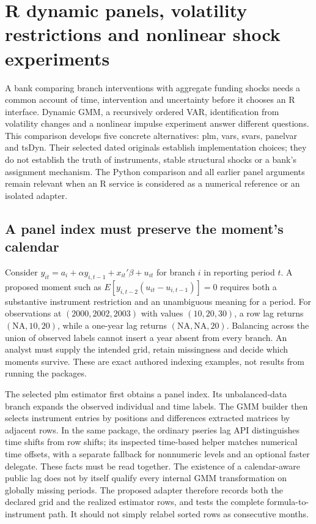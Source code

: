 \section[R dynamic panels and structural shocks]{R dynamic panels, volatility restrictions and nonlinear shock experiments}
\label{sec:exec25-r-dynamic}

A bank comparing branch interventions with aggregate funding shocks needs a common account of time, intervention and uncertainty before it chooses an R interface. Dynamic GMM, a recursively ordered VAR, identification from volatility changes and a nonlinear impulse experiment answer different questions. This comparison develops five concrete alternatives: plm, vars, svars, panelvar and tsDyn. Their selected dated originals establish implementation choices; they do not establish the truth of instruments, stable structural shocks or a bank's assignment mechanism. The Python comparison and all earlier panel arguments remain relevant when an R service is considered as a numerical reference or an isolated adapter.\citep{exec25_rdyn_plm,exec25_rdyn_vars,exec25_rdyn_svars,exec25_rdyn_panelvar,exec25_rdyn_tsdyn,exec25_rdyn_choice}

\subsection{A panel index must preserve the moment's calendar}

Consider $y_{it}=a_i+\alpha y_{i,t-1}+x_{it}'\beta+u_{it}$ for branch $i$ in reporting period $t$. A proposed moment such as $E[y_{i,t-2}(u_{it}-u_{i,t-1})]=0$ requires both a substantive instrument restriction and an unambiguous meaning for a period. For observations at $(2000,2002,2003)$ with values $(10,20,30)$, a row lag returns $(\mathrm{NA},10,20)$, while a one-year lag returns $(\mathrm{NA},\mathrm{NA},20)$. Balancing across the union of observed labels cannot insert a year absent from every branch. An analyst must supply the intended grid, retain missingness and decide which moments survive. These are exact authored indexing examples, not results from running the packages.\citep{exec25_rdyn_choice}

The selected plm estimator first obtains a panel index. Its unbalanced-data branch expands the observed individual and time labels. The GMM builder then selects instrument entries by positions and differences extracted matrices by adjacent rows. In the same package, the ordinary pseries lag API distinguishes time shifts from row shifts; its inspected time-based helper matches numerical time offsets, with a separate fallback for nonnumeric levels and an optional faster delegate. These facts must be read together. The existence of a calendar-aware public lag does not by itself qualify every internal GMM transformation on globally missing periods. The proposed adapter therefore records both the declared grid and the realized estimator rows, and tests the complete formula-to-instrument path. It should not simply relabel sorted rows as consecutive months.\citep{exec25_rdyn_plm}

